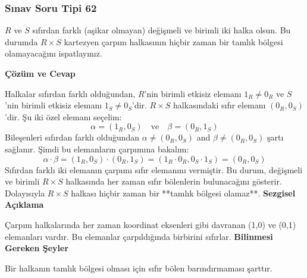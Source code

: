 \documentclass[11pt, a4paper]{article}
\newenvironment{cozum}{
    \vspace{0.5cm}
    \noindent\textcolor{green!60!black}{\faCheckCircle\enspace \textbf{\Large Çözüm ve Cevap}}\par\vspace{0.2cm}
}{}
\newenvironment{sezgisel}{
    \vspace{0.5cm}
    \noindent\textcolor{orange!80!black}{\faLightbulb\enspace \textbf{\Large Sezgisel Açıklama}}\par\vspace{0.2cm}
    \itshape
}{}
\newenvironment{bilgi}{
    \vspace{0.5cm}
    \noindent\textcolor{red!70!black}{\faExclamationTriangle\enspace \textbf{\Large Bilinmesi Gereken Şeyler}}\par\vspace{0.2cm}
}{}
\begin{document}
\subsubsection{Sınav Soru Tipi 62}
\begin{sinavbox}
$R$ ve $S$ sıfırdan farklı (aşikar olmayan) değişmeli ve birimli iki halka olsun. Bu durumda $R \times S$ kartezyen çarpım halkasının hiçbir zaman bir tamlık bölgesi olamayacağını ispatlayınız.
\end{sinavbox}
\begin{cozum}
Halkalar sıfırdan farklı olduğundan, $R$'nin birimli etkisiz elemanı $1_R \neq 0_R$ ve $S$'nin birimli etkisiz elemanı $1_S \neq 0_S$'dir.
$R \times S$ halkasındaki sıfır elemanı $(0_R, 0_S)$'dir.
Şu iki özel elemanı seçelim:
\[ \alpha = (1_R, 0_S) \quad \text{ve} \quad \beta = (0_R, 1_S) \]
Bileşenleri sıfırdan farklı olduğundan $\alpha \neq (0_R, 0_S)$ and $\beta \neq (0_R, 0_S)$ şartı sağlanır.
Şimdi bu elemanların çarpımına bakalım:
\[ \alpha \cdot \beta = (1_R, 0_S) \cdot (0_R, 1_S) = (1_R \cdot 0_R,  0_S \cdot 1_S) = (0_R, 0_S) \]
Sıfırdan farklı iki elemanın çarpımı sıfır elemanını vermiştir.
Bu durum, değişmeli ve birimli $R \times S$ halkasında her zaman sıfır bölenlerin bulunacağını gösterir.
Dolayısıyla $R \times S$ halkası hiçbir zaman bir **tamlık bölgesi olamaz**.
\end{cozum}
\begin{sezgisel}
Çarpım halkalarında her zaman koordinat eksenleri gibi davranan (1,0) ve (0,1) elemanları vardır. Bu elemanlar çarpıldığında birbirini sıfırlar.
\end{sezgisel}
\begin{bilgi}
Bir halkanın tamlık bölgesi olması için sıfır bölen barındırmaması şarttır.
\end{bilgi}

\newpage
\end{document}
